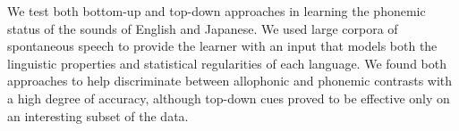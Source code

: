 We test both bottom-up and top-down approaches in learning the phonemic status of the sounds of English and Japanese. We used large corpora of spontaneous speech to provide the learner with an input that models both the linguistic properties and statistical regularities of each language. We found both approaches to help discriminate between allophonic and phonemic contrasts with a high degree of accuracy, although top-down cues proved to be effective only on an interesting subset of the data.
